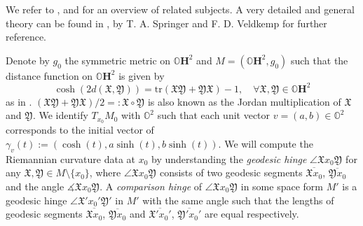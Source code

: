 \documentclass{article}
\newcommand{\OO}{\mathbb{O}}
\newcommand{\RR}{\mathbb{R}}
\newcommand{\tr}{\mathrm{tr}}
\newcommand{\FFX}{\mathfrak{X}}
\newcommand{\FFY}{\mathfrak{Y}}
\theoremstyle{definition}
\begin{document}
We refer to \cite[\S19. Spaces of $\RR$-rank 1]{Mostow73}, \cite[Appendix A]{Ruan1} and \cite{Baez} for an overview of related subjects. A very detailed and general theory can be found in \cite{Springer1}, \cite{Springer00} by T. A. Springer and F. D. Veldkemp for further reference.


Denote by $g_0$ the symmetric metric on $\OO\mathbf{H}^2$ and $M=(\OO\mathbf{H}^2,g_0)$ such that the distance function on $\OO\mathbf{H}^2$ is given by
$$\cosh(2d(\FFX,\FFY))=\tr(\FFX\FFY+\FFY\FFX)-1,\quad\forall \FFX,\FFY\in\OO\mathbf{H}^2$$
as in \cite{Mostow73}. $(\FFX\FFY+\FFY\FFX)/2=:\FFX\circ\FFY$ is also known as the Jordan multiplication of $\FFX$ and $\FFY$. We identify $T_{x_0}M_0$ with $\OO^2$ such that each unit vector $v=(a,b)\in\OO^2$ corresponds to the initial vector of $\gamma_v(t):=(\cosh(t),a\sinh(t),b\sinh(t))$. 
We will compute the Riemannian curvature data at $x_0$ by understanding the \textit{geodesic hinge} $\angle\FFX x_0\FFY$ for any $\FFX,\FFY\in M\setminus \{x_0\}$, where $\angle\FFX x_0\FFY$ consists of two geodesic segments $\overline{\FFX x_0}$, $\overline{\FFY x_0}$ and the angle $\measuredangle\FFX x_0\FFY$. A \textit{comparison hinge} of $\angle\FFX x_0\FFY$ in some space form $M'$ is a geodesic hinge $\angle\FFX 'x_0'\FFY'$ in $M'$ with the same angle such that the lengths of geodesic segments $\overline{\FFX x_0}$, $\overline{\FFY x_0}$ and $\overline{\FFX' x_0'}$, $\overline{\FFY' x_0'}$ are equal respectively.
\end{document}
